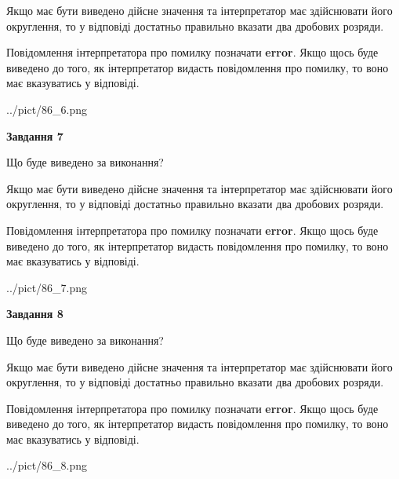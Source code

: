 \documentclass[12pt, ukrainian]{article}
\begin{document}
{\begin {Large}
Якщо має бути виведено дійсне значення та інтерпретатор має здійснювати його округлення, 
то у відповіді достатньо правильно вказати два дробових розряди.

Повідомлення інтерпретатора про помилку позначати \textbf{error}.
Якщо щось буде виведено до того, як інтерпретатор видасть повідомлення про помилку, 
то воно має вказуватись у відповіді. \par

\begin{center}
	{../pict/86_6.png}
\end{center}
\newpage

{\begin {center}\textbf{Завдання 7}\end {center}}\par
Що буде виведено за виконання? \par

Якщо має бути виведено дійсне значення та інтерпретатор має здійснювати його округлення, 
то у відповіді достатньо правильно вказати два дробових розряди.

Повідомлення інтерпретатора про помилку позначати \textbf{error}.
Якщо щось буде виведено до того, як інтерпретатор видасть повідомлення про помилку, 
то воно має вказуватись у відповіді. \par

\begin{center}
	{../pict/86_7.png}
\end{center}
\newpage

{\begin {center}\textbf{Завдання 8}\end {center}}\par
Що буде виведено за виконання? \par

Якщо має бути виведено дійсне значення та інтерпретатор має здійснювати його округлення, 
то у відповіді достатньо правильно вказати два дробових розряди.

Повідомлення інтерпретатора про помилку позначати \textbf{error}.
Якщо щось буде виведено до того, як інтерпретатор видасть повідомлення про помилку, 
то воно має вказуватись у відповіді. \par

\begin{center}
	{../pict/86_8.png}
\end{center}
\newpage


\end{Large}}
\end{document}
